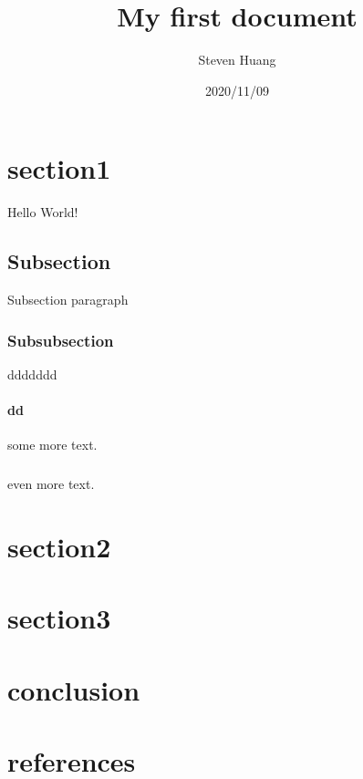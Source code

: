 \documentclass{article}
\title{ My first document}
\date{2020/11/09}
\author{Steven Huang}
\begin{document}
\maketitle
\newpage
{}

\section{section1}
Hello World!

\subsection{Subsection}
Subsection paragraph

\subsubsection{Subsubsection}
ddddddd

\paragraph{dd}
some more text.
\subparagraph{}
even more text.

\section{section2}
\section{section3}
\section{conclusion}
\section{references}
\end{document}
